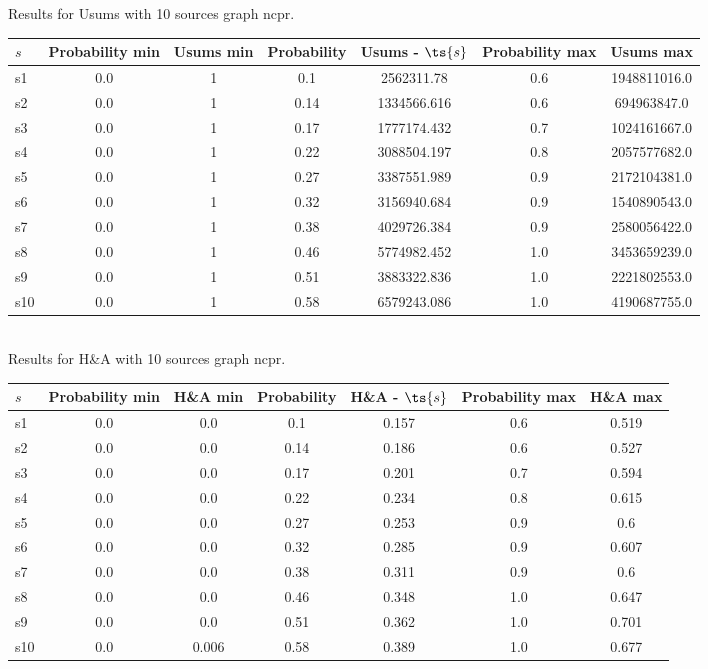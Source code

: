 \documentclass{article}
\begin{document}
\noindent Results for Usums with 10 sources graph ncpr.

\noindent\begin{tabular}{|l|c|c|c|c|c|c|}
\hline
$s$& Probability min & Usums min & Probability & Usums - $\ts{s}$ & Probability max & Usums max\\
\hline
s1 &0.0 & 1 & 0.1 & 2562311.78 & 0.6 & 1948811016.0\\
\hline
s2 &0.0 & 1 & 0.14 & 1334566.616 & 0.6 & 694963847.0\\
\hline
s3 &0.0 & 1 & 0.17 & 1777174.432 & 0.7 & 1024161667.0\\
\hline
s4 &0.0 & 1 & 0.22 & 3088504.197 & 0.8 & 2057577682.0\\
\hline
s5 &0.0 & 1 & 0.27 & 3387551.989 & 0.9 & 2172104381.0\\
\hline
s6 &0.0 & 1 & 0.32 & 3156940.684 & 0.9 & 1540890543.0\\
\hline
s7 &0.0 & 1 & 0.38 & 4029726.384 & 0.9 & 2580056422.0\\
\hline
s8 &0.0 & 1 & 0.46 & 5774982.452 & 1.0 & 3453659239.0\\
\hline
s9 &0.0 & 1 & 0.51 & 3883322.836 & 1.0 & 2221802553.0\\
\hline
s10 &0.0 & 1 & 0.58 & 6579243.086 & 1.0 & 4190687755.0\\
\hline
\end{tabular}\\

\noindent Results for H\&A with 10 sources graph ncpr.

\noindent\begin{tabular}{|l|c|c|c|c|c|c|}
\hline
$s$& Probability min & H\&A min & Probability & H\&A - $\ts{s}$ & Probability max & H\&A max\\
\hline
s1 &0.0 & 0.0 & 0.1 & 0.157 & 0.6 & 0.519\\
\hline
s2 &0.0 & 0.0 & 0.14 & 0.186 & 0.6 & 0.527\\
\hline
s3 &0.0 & 0.0 & 0.17 & 0.201 & 0.7 & 0.594\\
\hline
s4 &0.0 & 0.0 & 0.22 & 0.234 & 0.8 & 0.615\\
\hline
s5 &0.0 & 0.0 & 0.27 & 0.253 & 0.9 & 0.6\\
\hline
s6 &0.0 & 0.0 & 0.32 & 0.285 & 0.9 & 0.607\\
\hline
s7 &0.0 & 0.0 & 0.38 & 0.311 & 0.9 & 0.6\\
\hline
s8 &0.0 & 0.0 & 0.46 & 0.348 & 1.0 & 0.647\\
\hline
s9 &0.0 & 0.0 & 0.51 & 0.362 & 1.0 & 0.701\\
\hline
s10 &0.0 & 0.006 & 0.58 & 0.389 & 1.0 & 0.677\\
\hline
\end{tabular}\\
\end{document}
